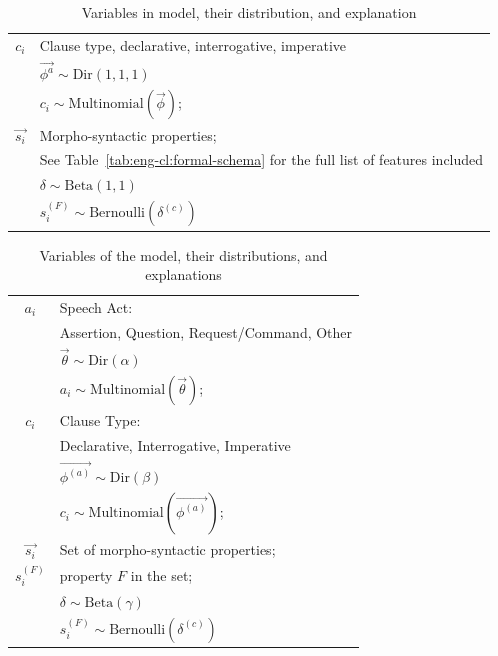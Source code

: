 \begin{table}[H]
    \centering
    \begin{tabular}{cl}
    \hline
    \hline
        $c_{i}$ &  Clause type, declarative, interrogative, imperative\\
        &$\vec{\phi^{a}} \sim \mbox{Dir}(1,1,1)$\\        
        & $ c_{i} \sim  \mbox{Multinomial}(\vec{\phi})$;\\
\hline
        $\vec{s_{i}}$ &  Morpho-syntactic properties; \\
        & See Table~\ref{tab:eng-cl:formal-schema} for the full list of features included \\
        &$\delta\sim \mbox{Beta}(1,1)$\\        
        & $s_{i}^{(F)} \sim \mbox{Bernoulli}(\delta^{(c)})$ \\
    \hline
    \hline
    \end{tabular}
    \caption{Variables in \distlearner{} model, their distribution, and explanation}
    \label{tab:engcl:baseline-variables}
\end{table}


\begin{table}[H]
    \centering
    \begin{tabular}{c|l}
    \hline
    \hline
        $a_{i}$ & Speech Act: \\
        	  &Assertion, Question, Request/Command, Other\\
          & $\vec{\theta} \sim \mbox{Dir}(\alpha)$\\
          & $ a_{i} \sim \mbox{Multinomial}(\vec{\theta})$;\\

\hline
         $c_{i}$ &  Clause Type:\\
        & Declarative, Interrogative, Imperative\\
        &$\vec{\phi^{(a)}} \sim \mbox{Dir}(\beta)$\\
        &  $c_{i} \sim  \mbox{Multinomial}(\vec{\phi^{(a)}})$;\\
\hline
        $\vec{s_{i}}$ &  Set of morpho-syntactic properties; \\
        $s_{i}^{(F)}$ &  property $F$ in the set;  \\
        &$\delta\sim \mbox{Beta}(\gamma)$\\        
        & $s_{i}^{(F)} \sim \mbox{Bernoulli}(\delta^{(c)})$ \\
    \hline
    \hline
    \end{tabular}
    \caption{Variables of the \plearnerabbr{} model, their distributions, and explanations}
    \label{tab:engcl:target-variables}
\end{table}


